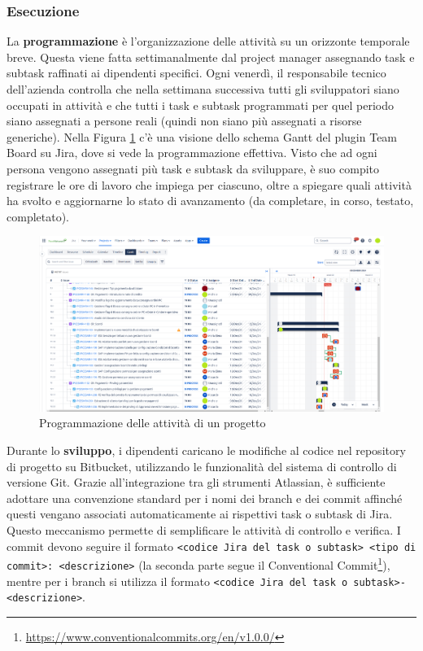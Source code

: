         \subsubsection{Esecuzione}
        La \textbf{programmazione} è l’organizzazione delle attività su un orizzonte temporale breve. Questa viene fatta settimanalmente dal project manager assegnando
        task e subtask raffinati ai dipendenti specifici. Ogni venerdì, il responsabile tecnico dell’azienda controlla che nella settimana successiva tutti gli
        sviluppatori siano occupati in attività e che tutti i task e subtask programmati per quel periodo siano assegnati a persone reali (quindi non siano più
        assegnati a risorse generiche). Nella Figura \ref{fig:programmazione-jira-progetto} c'è una visione dello schema Gantt del plugin Team Board su Jira, dove si vede la programmazione effettiva.
        Visto che ad ogni persona vengono assegnati più task e subtask da sviluppare, è suo compito registrare le ore di lavoro che impiega per ciascuno,
        oltre a spiegare quali attività ha svolto e aggiornarne lo stato di avanzamento (da completare, in corso, testato, completato).

        \begin{figure}
            \centering
            \includegraphics[width=\linewidth]{figures/programmazioneAttivita.png}
            \caption{Programmazione delle attività di un progetto}
            \label{fig:programmazione-jira-progetto}
        \end{figure}

        Durante lo \textbf{sviluppo}, i dipendenti caricano le modifiche al codice nel repository di progetto su Bitbucket, utilizzando le funzionalità del sistema
        di controllo di versione Git. Grazie all’integrazione tra gli strumenti Atlassian, è sufficiente adottare una convenzione standard per i nomi dei
        branch e dei commit affinché questi vengano associati automaticamente ai rispettivi task o subtask di Jira. Questo meccanismo permette di semplificare
        le attività di controllo e verifica. I commit devono seguire il formato \texttt{<codice Jira del task o subtask> <tipo di commit>: <descrizione>} (la
        seconda parte segue il Conventional Commit\footnote{\url{https://www.conventionalcommits.org/en/v1.0.0/}}), mentre per i branch si utilizza il formato \texttt{<codice Jira del task o subtask>-<descrizione>}.

